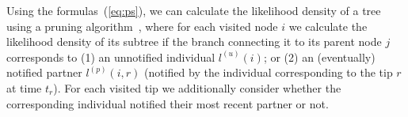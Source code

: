 \documentclass[a4paper,10pt]{article}
\begin{document}
Using the formulas~(\ref{eq:ps}), we can calculate the likelihood density of a tree using a pruning algorithm~\cite{10.1093/sysbio/22.3.240}, where for each visited node $i$ we calculate the likelihood density of its subtree if the branch connecting it to its parent node $j$ corresponds to (1) an unnotified individual $l^{(u)}(i)$; or (2) an (eventually) notified partner $l^{(p)}(i, r)$ (notified by the individual corresponding to the tip $r$ at time $t_r$). For each visited tip we additionally consider whether the corresponding individual notified their most recent partner or not.

\end{document}
